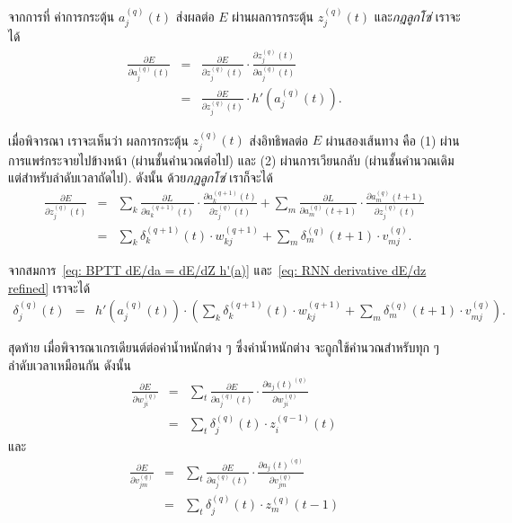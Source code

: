 จากการที่
ค่าการกระตุ้น $a_j^{(q)}(t)$ ส่งผลต่อ $E$ ผ่านผลการกระตุ้น $z_j^{(q)}(t)$
และ\textit{กฎลูกโซ่} 
เราจะได้
\begin{eqnarray}
\frac{\partial E}{\partial a_j^{(q)}(t)}
&=& \frac{\partial E}{\partial z_j^{(q)}(t)} 
\cdot \frac{\partial z_j^{(q)}(t)}{\partial a_j^{(q)}(t)}
\nonumber \\
&=& \frac{\partial E}{\partial z_j^{(q)}(t)} 
\cdot h'(a_j^{(q)}(t))
\label{eq: BPTT dE/da = dE/dZ h'(a)} .
\end{eqnarray}

เมื่อพิจารณา เราจะเห็นว่า
ผลการกระตุ้น $z_j^{(q)}(t)$ ส่งอิทธิพลต่อ $E$ ผ่านสองเส้นทาง คือ
(1) ผ่านการแพร่กระจายไปข้างหน้า (ผ่านชั้นคำนวณต่อไป) และ (2) ผ่านการเวียนกลับ (ผ่านชั้นคำนวณเดิม แต่สำหรับลำดับเวลาถัดไป).
ดังนั้น ด้วย\textit{กฎลูกโซ่} เราก็จะได้
\begin{eqnarray}
\frac{\partial E}{\partial z_j^{(q)}(t)}
&=& \sum_k \frac{\partial L}{\partial a_k^{(q+1)}(t)} \cdot \frac{\partial a_k^{(q+1)}(t)}{\partial z_j^{(q)}(t)} 
+ \sum_m  \frac{\partial L}{\partial a_m^{(q)}(t+1)} \cdot \frac{\partial a_m^{(q)}(t+1)}{\partial z_j^{(q)}(t)}
\label{eq: RNN derivative dE/dz} \\
&=& \sum_k \delta_k^{(q+1)}(t) \cdot w_{kj}^{(q+1)} 
+ \sum_m  \delta_m^{(q)}(t+1) \cdot v_{mj}^{(q)}
\label{eq: RNN derivative dE/dz refined} .
\end{eqnarray}

จากสมการ~\ref{eq: BPTT dE/da = dE/dZ h'(a)} และ~\ref{eq: RNN derivative dE/dz refined}
เราจะได้
\begin{eqnarray}
\delta_j^{(q)}(t) &=& h'(a_j^{(q)}(t))
\cdot \left(\sum_k \delta_k^{(q+1)}(t) \cdot w_{kj}^{(q+1)} 
+ \sum_m  \delta_m^{(q)}(t+1) \cdot v_{mj}^{(q)}\right)
\label{eq: RNN delta} .
\end{eqnarray}

สุดท้าย เมื่อพิจารณาเกรเดียนต์ต่อค่าน้ำหนักต่าง ๆ 
ซึ่งค่าน้ำหนักต่าง จะถูกใช้คำนวณสำหรับทุก ๆ ลำดับเวลาเหมือนกัน
ดังนั้น
\begin{eqnarray}
\frac{\partial E}{\partial w_{ji}^{(q)}}
&=& \sum_t \frac{\partial E}{\partial a_j^{(q)}(t)} \cdot \frac{\partial a_j(t)^{(q)}}{\partial w_{ji}^{(q)}}
\label{eq: RNN derivative dE/dw} \\
&=& \sum_t \delta_j^{(q)}(t) \cdot z_i^{(q-1)}(t)
\label{eq: RNN derivative dE/dw refined}
\end{eqnarray}
และ
\begin{eqnarray}
\frac{\partial E}{\partial v_{jm}^{(q)}}
&=& \sum_t \frac{\partial E}{\partial a_j^{(q)}(t)} \cdot \frac{\partial a_j(t)^{(q)}}{\partial v_{jm}^{(q)}}
\label{eq: RNN derivative dE/dv} \\
&=& \sum_t \delta_j^{(q)}(t) \cdot z_m^{(q)}(t-1)
\label{eq: RNN derivative dE/dv refined}
\end{eqnarray}

